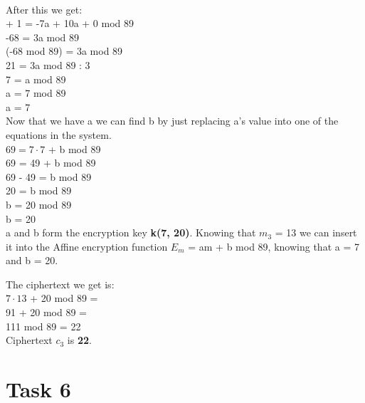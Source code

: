 \documentclass[12pt]{article}
\begin{document}
\noindent \\After this we get: \\

 + 1 = -7a + 10a + 0 mod 89 \\
-68 = 3a mod 89 \\
(-68 mod 89) = 3a mod 89 \\
21 = 3a mod 89 \textbar{} : 3\\
7 = a mod 89 \\
a = 7 mod 89 \\
a = 7 \\

\noindent Now that we have a we can find b by just replacing a's value into one of the equations in the system. \\

\noindent $69 = 7 \cdot 7$ + b mod 89 \\
69 = 49 + b mod 89 \\
69 - 49 = b mod 89 \\
20 = b mod 89 \\
b = 20 mod 89 \\
b = 20 \\

\noindent a and b form the encryption key \textbf{k(7, 20)}.
Knowing that $m_3$ = 13 we can insert it into the Affine encryption function
$E_m$ = am + b mod 89, knowing that a = 7 and b = 20. \\
\pagebreak

\noindent The ciphertext we get is: \\

\noindent $7 \cdot 13$ + 20 mod 89 = \\
91 + 20 mod 89 = \\
111 mod 89 = 22 \\

\noindent Ciphertext $c_3$ is \textbf{22}.

\section*{Task 6}
\end{document}
